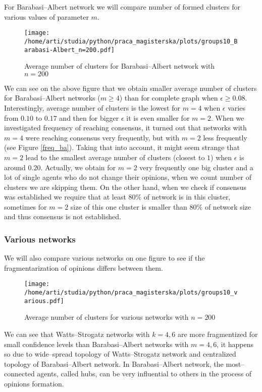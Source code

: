 \documentclass{article}
\begin{document}
For Barabasi--Albert network we will compare number of formed clusters for various values of parameter $m$.

\begin{figure}[H]
		\centering
		\texttt{[image: /home/arti/studia/python/praca\_magisterska/plots/groups10\_Barabasi-Albert\_n=200.pdf]}
		\caption{Average number of clusters for Barabasi--Albert network with $n=200$}
\end{figure}

We can see on the above figure that we obtain smaller average number of clusters for Barabasi--Albert networks ($m \geq 4$) than for complete graph when $\epsilon \geq 0.08$. Interestingly, average number of clusters is the lowest for $m=4$ when $\epsilon$ varies from $0.10$ to $0.17$ and then for bigger $\epsilon$ it is even smaller for $m=2$. When we investigated frequency of reaching consensus, it turned out that networks with $m=4$ were reaching consensus very frequently, but with $m=2$ less frequently (see Figure \ref{freq_ba}). Taking that into account, it might seem strange that $m=2$ lead to the smallest average number of clusters (closest to $1$) when $\epsilon$ is around $0.20$. Actually, we obtain for $m=2$ very frequently one big cluster and a lot of single agents who do not change their opinions, when we count number of clusters we are skipping them. On the other hand, when we check if consensus was established we require that at least $80\%$ of network is in this cluster, sometimes for $m=2$ size of this one cluster is smaller than $80\%$ of network size and thus consensus is not established.

\subsubsection{Various networks}

We will also compare various networks on one figure to see if the fragmentarization of opinions differs between them.

\begin{figure}[H]
		\centering
		\texttt{[image: /home/arti/studia/python/praca\_magisterska/plots/groups10\_various.pdf]}
		\caption{Average number of clusters for various networks with $n=200$}
\end{figure}

We can see that Watts--Strogatz networks with $k=4,6$ are more fragmentized for small confidence levels than Barabasi--Albert networks with $m=4,6$, it happens so due to wide--spread topology of Watts--Strogatz network and centralized topology of Barabasi--Albert network. In Barabasi--Albert network, the most--connected agents, called hubs, can be very influential to others in the process of opinions formation.
\indent
\end{document}
